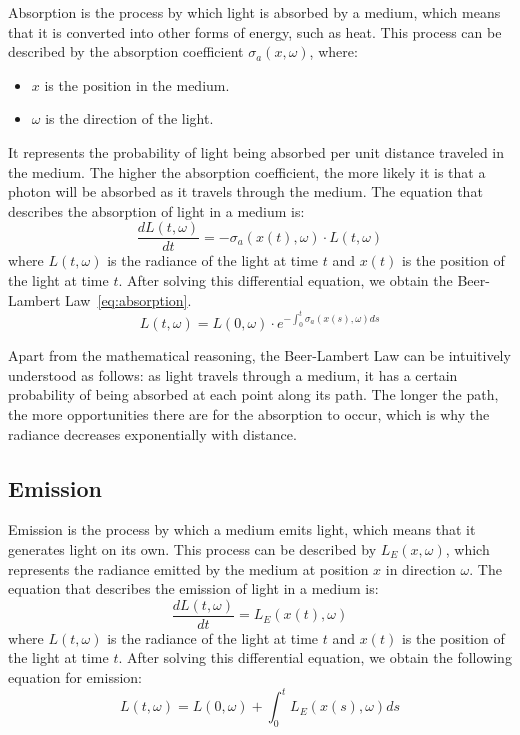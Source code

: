 Absorption is the process by which light is absorbed by a medium, which means that it is converted into other forms of energy, such as heat. This process can be described by the absorption coefficient $\sigma_a(x, \omega)$, where:
\begin{itemize}
    \item $x$ is the position in the medium.
    \item $\omega$ is the direction of the light.
\end{itemize}

It represents the probability of light being absorbed per unit distance traveled in the medium. The higher the absorption coefficient, the more likely it is that a photon will be absorbed as it travels through the medium. The equation that describes the absorption of light in a medium is:
\begin{equation}\label{eq:absorption_differential}
\frac{dL(t,\omega)}{dt} = -\sigma_a(x(t), \omega) \cdot L(t,\omega)
\end{equation}
where $L(t,\omega)$ is the radiance of the light at time $t$ and $x(t)$ is the position of the light at time $t$. After solving this differential equation, we obtain the Beer-Lambert Law~\eqref{eq:absorption}.
\begin{equation}\label{eq:absorption}
    L(t,\omega) = L(0,\omega) \cdot e^{\displaystyle -\int_0^t \sigma_a(x(s), \omega) ds}
\end{equation}

\begin{observacion}
    Apart from the mathematical reasoning, the Beer-Lambert Law can be intuitively understood as follows: as light travels through a medium, it has a certain probability of being absorbed at each point along its path. The longer the path, the more opportunities there are for the absorption to occur, which is why the radiance decreases exponentially with distance.
\end{observacion}

\subsection{Emission}

Emission is the process by which a medium emits light, which means that it generates light on its own. This process can be described by $L_E(x, \omega)$, which represents the radiance emitted by the medium at position $x$ in direction $\omega$. The equation that describes the emission of light in a medium is:
\begin{equation*}
\frac{dL(t,\omega)}{dt} = L_E(x(t), \omega)
\end{equation*}
where $L(t,\omega)$ is the radiance of the light at time $t$ and $x(t)$ is the position of the light at time $t$. After solving this differential equation, we obtain the following equation for emission:
\begin{equation}\label{eq:emission}
    L(t,\omega) = L(0,\omega) + \int_0^t L_E(x(s), \omega) ds
\end{equation}

